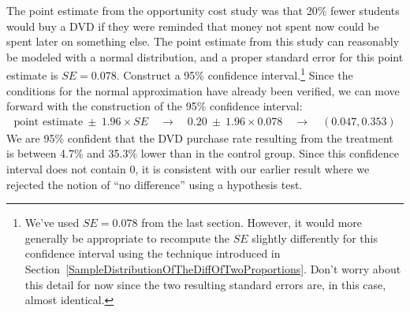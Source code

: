 \begin{example}{The point estimate from the opportunity cost study was that 20\% fewer students would buy a DVD if they were reminded that money not spent now could be spent later on something else. The point estimate from this study can reasonably be modeled with a normal distribution, and a proper standard error for this point estimate is $SE = 0.078$. Construct a 95\% confidence interval.\footnote{We've used $SE = 0.078$ from the last section. However, it would more generally be appropriate to recompute the $SE$ slightly differently for this confidence interval using the technique introduced in Section~\ref{SampleDistributionOfTheDiffOfTwoProportions}. Don't worry about this detail for now since the two resulting standard errors are, in this case, almost identical.}}
Since the conditions for the normal approximation have already been verified, we can move forward with the construction of the 95\% confidence interval:
\begin{align*}
\text{point estimate}\ \pm\ 1.96 \times SE \quad \rightarrow \quad
0.20\ \pm\ 1.96 \times 0.078 \quad \rightarrow \quad
(0.047, 0.353)
\end{align*}
We are 95\% confident that the DVD purchase rate resulting from the treatment is between 4.7\% and 35.3\% lower than in the control group. Since this confidence interval does not contain 0, it is consistent with our earlier result where we rejected the notion of ``no difference'' using a hypothesis test.
\end{example}

